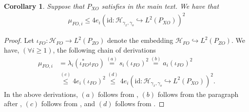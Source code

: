 \documentclass[11pt]{article}
\newcommand{\calH}{\mathcal{H}}
\newcommand{\0}{\mathbf{0}}
\newtheorem{cor}{Corollary}[section]
\begin{document}
\begin{appendix}
\begin{cor}
\label{cor:CFO_evalue_entropy_bound}
    Suppose that $P_{XO}$ satisfies  in the main text. We have that 
    \begin{align*}
        \mu_{FO,i}\leq 4e_i(\mathrm{id}:\calH_{\gamma_x,\gamma_o}\hookrightarrow L^2(P_{XO}))^2
    \end{align*}
\end{cor}

\begin{proof}
Let $\iota_{FO}: \calH_{FO}\to L^2(P_{ZO})$ denote the  embedding $\calH_{FO}\hookrightarrow L^2(P_{ZO})$. We have, $(\forall i\geq 1)$, the following chain of derivations
\begin{align*}
    \mu_{FO,i} &= \lambda_i(\iota_{FO}^{\ast}\iota_{FO}) \stackrel{(a)}{=} s_i(\iota_{FO})^2 \stackrel{(b)}{=} a_i(\iota_{FO})^2\\
    &\stackrel{(c)}{\leq} 4e_i(\iota_{FO})^2 \stackrel{(d)}{\leq} 4e_i(\mathrm{id}:\calH_{\gamma_x,\gamma_o}\hookrightarrow L^2(P_{XO}))^2.
\end{align*}
In the above derivations, $(a)$ follows from \citet[Eq. (A.25)]{steinwart2008support}, $(b)$ follows from the paragraph after \citet[Eq. (A.29)]{steinwart2008support}, $(c)$ follows from \citet[Eq. (A.44)]{steinwart2008support}, and $(d)$ follows from .
\end{proof}





\end{appendix}
\end{document}

